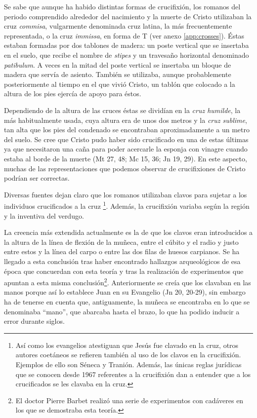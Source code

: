 Se sabe que aunque ha habido distintas formas de crucifixión, los romanos del periodo comprendido alrededor del nacimiento y la muerte de Cristo utilizaban la cruz \textit{commisa}, vulgarmente denominada cruz latina, la más frecuentemente representada, o la cruz \textit{immissa}, en forma de T (ver anexo \autoref{app:crosses}). Éstas estaban formadas por dos tablones de madera: un poste vertical que se insertaba en el suelo, que recibe el nombre de \textit{stipes} y un travesaño horizontal denominado \textit{patibulum}. A veces en la mitad del poste vertical se insertaba un bloque de madera que servía de asiento. También se utilizaba, aunque probablemente posteriormente al tiempo en el que vivió Cristo, un tablón que colocado a la altura de los pies ejercía de apoyo para éstos.

Dependiendo de la altura de las cruces éstas se dividían en la \textit{cruz humilde}, la más habitualmente usada, cuya altura era de unos dos metros y la \textit{cruz sublime}, tan alta que los pies del condenado se encontraban aproximadamente a un metro del suelo. Se cree que Cristo pudo haber sido crucificado en una de estas últimas ya que necesitaron una caña para poder acercarle la esponja con vinagre cuando estaba al borde de la muerte (Mt 27, 48; Mc 15, 36; Jn 19, 29). En este aspecto, muchas de las representaciones que podemos observar de crucifixiones de Cristo podrían ser correctas.

Diversas fuentes dejan claro que los romanos utilizaban clavos para sujetar a los individuos crucificados a la cruz \footnote{Así como los evangelios atestiguan que Jesús fue clavado en la cruz, otros autores coetáneos se refieren también al uso de los clavos en la crucifixión. Ejemplos de ello son Séneca y Tranión. Además, las únicas reglas jurídicas que se conocen desde 1967 referentes a la crucifixión dan a entender que a los crucificados se les clavaba en la cruz.}. Además, la crucifixión variaba según la región y la inventiva del verdugo.

La creencia más extendida actualmente es la de que los clavos eran introducidos a la altura de la línea de flexión  de la muñeca, entre el cúbito y el radio y justo entre estos y la línea del carpo o entre las dos filas de huesos carpianos. Se ha llegado a esta conclusión tras haber encontrado hallazgos arqueológicos de esa época que concuerdan con esta teoría y tras la realización de experimentos que apuntan a esta misma conclusión\footnote{El doctor Pierre Barbet realizó una serie de experimentos con cadáveres en los que se demostraba esta teoría.}. Anteriormente se creía que los clavaban en las manos porque así lo establece Juan en su Evangelio (Jn 20, 20-29), sin embargo ha de tenerse en cuenta que, antiguamente, la muñeca se encontraba en lo que se denominaba ``mano'', que abarcaba hasta el brazo, lo que ha podido inducir a error durante siglos.

